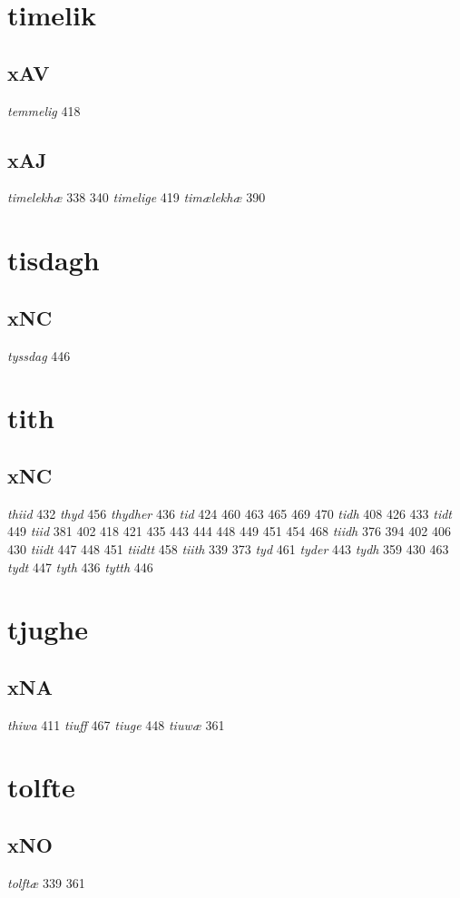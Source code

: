 \documentclass[a4paper,twocolumn]{article}
\begin{document}
\section{timelik}
\label{sec:org968bb35}
\subsection{xAV}
\label{sec:orge36ab91}
\emph{temmelig} 418 
\subsection{xAJ}
\label{sec:org0b87f12}
\emph{timelekhæ} 338 340 \emph{timelige} 419 \emph{timælekhæ} 390 
\section{tisdagh}
\label{sec:orgb2d40e1}
\subsection{xNC}
\label{sec:orge177a32}
\emph{tyssdag} 446 
\section{tith}
\label{sec:org624b95a}
\subsection{xNC}
\label{sec:orga1309ee}
\emph{thiid} 432 \emph{thyd} 456 \emph{thydher} 436 \emph{tid} 424 460 463 465 469 470 \emph{tidh} 408 426 433 \emph{tidt} 449 \emph{tiid} 381 402 418 421 435 443 444 448 449 451 454 468 \emph{tiidh} 376 394 402 406 430 \emph{tiidt} 447 448 451 \emph{tiidtt} 458 \emph{tiith} 339 373 \emph{tyd} 461 \emph{tyder} 443 \emph{tydh} 359 430 463 \emph{tydt} 447 \emph{tyth} 436 \emph{tytth} 446 
\section{tjughe}
\label{sec:org1ab7720}
\subsection{xNA}
\label{sec:org4aee159}
\emph{thiwa} 411 \emph{tiuff} 467 \emph{tiuge} 448 \emph{tiuwæ} 361 
\section{tolfte}
\label{sec:org1f19955}
\subsection{xNO}
\label{sec:orgb44a5b6}
\emph{tolftæ} 339 361 
\end{document}
